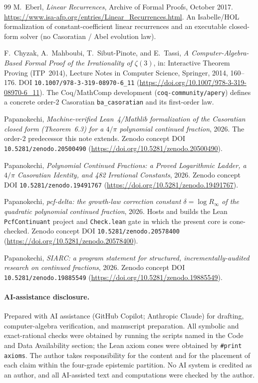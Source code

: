 \documentclass[11pt]{article}
\begin{document}
\begin{thebibliography}{99}
M.~Eberl,
\emph{Linear Recurrences},
Archive of Formal Proofs, October 2017.
\url{https://www.isa-afp.org/entries/Linear_Recurrences.html}.
An Isabelle/HOL formalization of constant-coefficient linear recurrences and an
executable closed-form solver (no Casoratian / Abel evolution law).

F.~Chyzak, A.~Mahboubi, T.~Sibut-Pinote, and E.~Tassi,
\emph{A Computer-Algebra-Based Formal Proof of the Irrationality of $\zeta(3)$},
in: Interactive Theorem Proving (ITP~2014), Lecture Notes in Computer Science,
Springer, 2014, 160--176. DOI \texttt{10.1007/978-3-319-08970-6\_11}
(\url{https://doi.org/10.1007/978-3-319-08970-6_11}).
The Coq/MathComp development (\texttt{coq-community/apery}) defines a concrete
order-$2$ Casoratian \texttt{ba\_casoratian} and its first-order law.

Papanokechi,
\emph{Machine-verified Lean~4/Mathlib formalization of the Casoratian closed form
(Theorem~6.3) for a $4/\pi$ polynomial continued fraction}, 2026.
The order-$2$ predecessor this note extends. Zenodo concept DOI
\texttt{10.5281/zenodo.20500490} (\url{https://doi.org/10.5281/zenodo.20500490}).

Papanokechi,
\emph{Polynomial Continued Fractions: a Proved Logarithmic Ladder, a $4/\pi$
Casoratian Identity, and 482 Irrational Constants}, 2026.
Zenodo concept DOI \texttt{10.5281/zenodo.19491767}
(\url{https://doi.org/10.5281/zenodo.19491767}).

Papanokechi,
\emph{pcf-delta: the growth-law correction constant $\delta=\log R_\infty$ of the
quadratic polynomial continued fraction}, 2026.
Hosts and builds the Lean \texttt{PcfContinuant} project and \texttt{Check.lean} gate
in which the present core is cone-checked. Zenodo concept DOI
\texttt{10.5281/zenodo.20578400} (\url{https://doi.org/10.5281/zenodo.20578400}).

Papanokechi,
\emph{SIARC: a program statement for structured, incrementally-audited research on
continued fractions}, 2026.
Zenodo concept DOI \texttt{10.5281/zenodo.19885549}
(\url{https://doi.org/10.5281/zenodo.19885549}).

\end{thebibliography}

\paragraph{AI-assistance disclosure.}
Prepared with AI assistance (GitHub Copilot; Anthropic Claude) for drafting,
computer-algebra verification, and manuscript preparation. All symbolic and
exact-rational checks were obtained by running the scripts named in the Code and Data
Availability section; the Lean axiom cones were obtained by \texttt{\#print axioms}. The
author takes responsibility for the content and for the placement of each claim within
the four-grade epistemic partition. No AI system is credited as an author, and all
AI-assisted text and computations were checked by the author.
\end{document}
